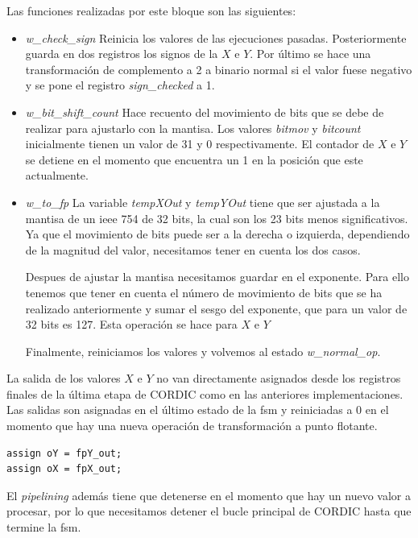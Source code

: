 Las funciones realizadas por este bloque son las siguientes:

\begin{itemize}	
	\item \textit{w\_check\_sign} Reinicia los valores de las ejecuciones pasadas. Posteriormente guarda en dos registros los signos de la $X$ e $Y$. Por último se hace una transformación de complemento a 2 a binario normal si el valor fuese negativo y se pone el registro \textit{sign\_checked} a 1.
	
	\item \textit{w\_bit\_shift\_count} Hace recuento del movimiento de bits que se debe de realizar para ajustarlo con la mantisa. Los valores \textit{bitmov} y \textit{bitcount} inicialmente tienen un valor de 31 y 0 respectivamente. El contador de $X$ e $Y$ se detiene en el momento que encuentra un 1 en la posición que este actualmente.
	
	\item \textit{w\_to\_fp} La variable \textit{tempXOut} y \textit{tempYOut} tiene que ser ajustada a la mantisa de un \gls{ieee} 754 de 32 bits, la cual son los 23 bits menos significativos. Ya que el movimiento de bits puede ser a la derecha o izquierda, dependiendo de la magnitud del valor, necesitamos tener en cuenta los dos casos.
	
	Despues de ajustar la mantisa necesitamos guardar en el exponente. Para ello tenemos que tener en cuenta el número de movimiento de bits que se ha realizado anteriormente y sumar el sesgo del exponente, que para un valor de 32 bits es 127. Esta operación se hace para $X$ e $Y$
	
	Finalmente, reiniciamos los valores y volvemos al estado \textit{w\_normal\_op}.
\end{itemize}

La salida de los valores $X$ e $Y$ no van directamente asignados desde los registros finales de la última etapa de CORDIC como en las anteriores implementaciones. Las salidas son asignadas en el último estado de la \gls{fsm} y reiniciadas a 0 en el momento que hay una nueva operación de transformación a punto flotante.

\begin{lstlisting}[caption={Cambio en las asignaciones de las salidas de CORDIC en punto flotante}]
assign oY = fpY_out;
assign oX = fpX_out;
\end{lstlisting}

El \textit{pipelining} además tiene que detenerse en el momento que hay un nuevo valor a procesar, por lo que necesitamos detener el bucle principal de CORDIC hasta que termine la \gls{fsm}.


